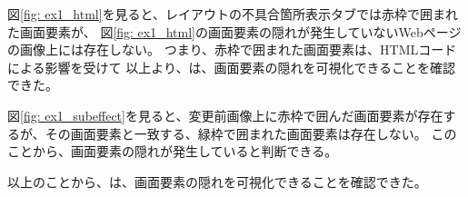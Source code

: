 図\ref{fig: ex1_html}を見ると、レイアウトの不具合箇所表示タブでは赤枠で囲まれた画面要素が、
図\ref{fig: ex1_html}の画面要素の隠れが発生していないWebページの画像上には存在しない。
つまり、赤枠で囲まれた画面要素は、HTMLコードによる影響を受けて
以上より、\toolName は、画面要素の隠れを可視化できることを確認できた。

図\ref{fig: ex1_subeffect}を見ると、変更前画像上に赤枠で囲んだ画面要素が存在するが、その画面要素と一致する、緑枠で囲まれた画面要素は存在しない。
このことから、画面要素の隠れが発生していると判断できる。
\par
以上のことから、\toolName は、画面要素の隠れを可視化できることを確認できた。

